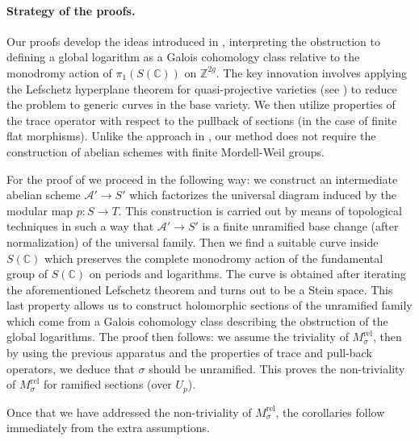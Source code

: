 \documentclass[10 pt,a4paper]{article}
\theoremstyle{plain}
\theoremstyle{definition}
\theoremstyle{named}
\newcommand{\cA}{\mathcal A}
\newcommand{\bC}{\mathbb C}
\begin{document}
\paragraph{Strategy of the proofs.}

Our proofs develop the ideas introduced in \cite{CZ}, interpreting the obstruction to defining a global logarithm as a Galois cohomology class relative to the monodromy action of $\pi_1(S(\mathbb{C}))$ on $\mathbb{Z}^{2g}$. The key innovation involves applying the Lefschetz hyperplane theorem for quasi-projective varieties (see \cite[Part II, 1.2, Theorem]{GorMac}) to reduce the problem to generic curves in the base variety. We then utilize properties of the trace operator with respect to the pullback of sections (in the case of finite flat morphisms). Unlike the approach in \cite{CZ}, our method does not require the construction of abelian schemes with finite Mordell-Weil groups.

For the proof of  we proceed in the following way:  we construct an intermediate abelian scheme $\cA' \to S'$ which factorizes the universal diagram induced by the modular map $p:S \to T$. This construction is carried out by means of topological techniques in such a way that $\cA' \to S'$ is a finite unramified base change (after normalization) of the universal family. Then we find a suitable curve inside $S(\bC)$ which preserves the complete monodromy action of the fundamental group of $S(\bC)$ on periods and logarithms. The curve is obtained after iterating the aforementioned Lefschetz theorem and turns out to be a Stein space. This last property allows us to construct holomorphic sections of the unramified family which come from a Galois cohomology class describing the obstruction of the global logarithms. The proof then follows: we assume the triviality of $M_\sigma^\textrm{rel}$, then by using the previous apparatus and the properties of trace and pull-back operators, we deduce that $\sigma$ should be unramified. This proves the non-triviality of $M_\sigma^{\textrm{rel}}$ for ramified sections (over $U_p$).

Once that we have addressed the non-triviality of $M^{\textrm{rel}}_\sigma$, the corollaries follow immediately from the extra assumptions.
\end{document}
